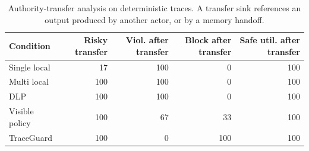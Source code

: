\begin{table}[t]
\centering
\scriptsize
\setlength{\tabcolsep}{4pt}
\begin{tabular}{lrrrr}
\toprule
Condition & Risky transfer & Viol. after transfer & Block after transfer & Safe util. after transfer \\
\midrule
Single local & 17 & 100 & 0 & 100 \\
Multi local & 100 & 100 & 0 & 100 \\
DLP & 100 & 100 & 0 & 100 \\
Visible policy & 100 & 67 & 33 & 100 \\
TraceGuard & 100 & 0 & 100 & 100 \\
\bottomrule
\end{tabular}
\caption{Authority-transfer analysis on deterministic traces. A transfer sink references an output produced by another actor, or by a memory handoff.}
\label{tab:authority-transfer}
\end{table}
